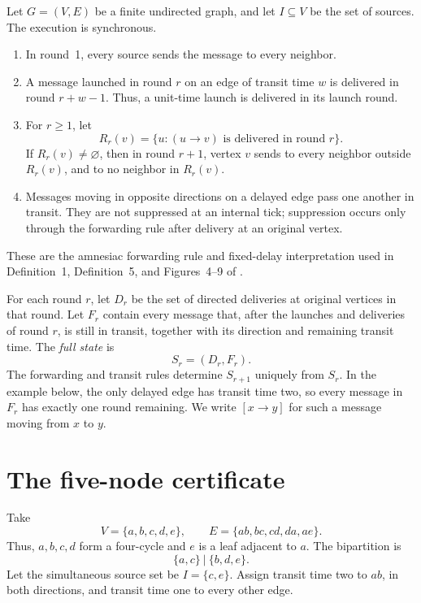 \documentclass[11pt]{article}
\newcommand{\delivers}{\mathrel{\to}}
\newcommand{\inflight}[2]{[#1\delivers #2]}
\begin{document}
Let \(G=(V,E)\) be a finite undirected graph, and let \(I\subseteq V\) be the
set of sources.  The execution is synchronous.
\begin{enumerate}
  \item In round~1, every source sends the message to every neighbor.
  \item A message launched in round \(r\) on an edge of transit time \(w\)
        is delivered in round \(r+w-1\).  Thus, a unit-time launch is
        delivered in its launch round.
  \item For \(r\geq 1\), let
        \[
        R_r(v)=\{u:(u\delivers v)\text{ is delivered in round }r\}.
        \]
        If \(R_r(v)\neq\varnothing\), then in round \(r+1\), vertex \(v\)
        sends to every neighbor outside \(R_r(v)\), and to no neighbor in
        \(R_r(v)\).
  \item Messages moving in opposite directions on a delayed edge pass one
        another in transit.  They are not suppressed at an internal tick;
        suppression occurs only through the forwarding rule after delivery
        at an original vertex.
\end{enumerate}
These are the amnesiac forwarding rule and fixed-delay interpretation used
in Definition~1, Definition~5, and Figures~4--9 of \cite{HT2023}.

For each round \(r\), let \(D_r\) be the set of directed deliveries at
original vertices in that round.  Let \(F_r\) contain every message that,
after the launches and deliveries of round \(r\), is still in transit,
together with its direction and remaining transit time.  The \emph{full
state} is
\[
S_r=(D_r,F_r).
\]
The forwarding and transit rules determine \(S_{r+1}\) uniquely from
\(S_r\).  In the example below, the only delayed edge has transit time two,
so every message in \(F_r\) has exactly one round remaining.  We write
\(\inflight{x}{y}\) for such a message moving from \(x\) to \(y\).

\section{The five-node certificate}\label{sec:certificate}

Take
\[
V=\{a,b,c,d,e\},\qquad
E=\{ab,bc,cd,da,ae\}.
\]
Thus, \(a,b,c,d\) form a four-cycle and \(e\) is a leaf adjacent to \(a\).
The bipartition is
\[
\{a,c\}\ \big|\ \{b,d,e\}.
\]
Let the simultaneous source set be \(I=\{c,e\}\).  Assign transit time two
to \(ab\), in both directions, and transit time one to every other edge.
\end{document}
